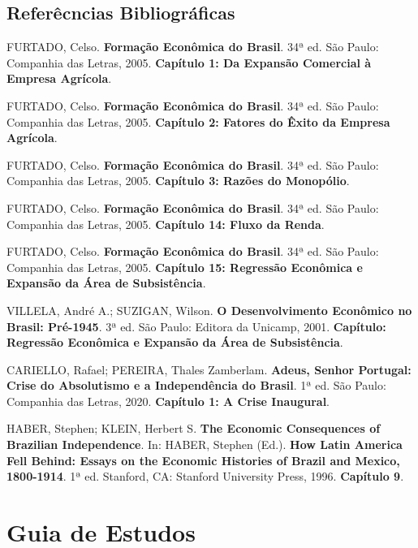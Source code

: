 \documentclass[a4paper,12pt]{article}[abntex2]
\begin{document}
\subsection{\textbf{Referêcncias Bibliográficas}}
\begin{thebibliography}{99}

FURTADO, Celso. \textbf{Formação Econômica do Brasil}. 34ª ed. São Paulo: Companhia das Letras, 2005.
\textbf{Capítulo 1: Da Expansão Comercial à Empresa Agrícola}.

FURTADO, Celso. \textbf{Formação Econômica do Brasil}. 34ª ed. São Paulo: Companhia das Letras, 2005.
\textbf{Capítulo 2: Fatores do Êxito da Empresa Agrícola}.

FURTADO, Celso. \textbf{Formação Econômica do Brasil}. 34ª ed. São Paulo: Companhia das Letras, 2005.
\textbf{Capítulo 3: Razões do Monopólio}.

FURTADO, Celso. \textbf{Formação Econômica do Brasil}. 34ª ed. São Paulo: Companhia das Letras, 2005.
\textbf{Capítulo 14: Fluxo da Renda}.

FURTADO, Celso. \textbf{Formação Econômica do Brasil}. 34ª ed. São Paulo: Companhia das Letras, 2005.
\textbf{Capítulo 15: Regressão Econômica e Expansão da Área de Subsistência}.

VILLELA, André A.; SUZIGAN, Wilson. \textbf{O Desenvolvimento Econômico no Brasil: Pré-1945}. 3ª ed. São Paulo: Editora da Unicamp, 2001.
\textbf{Capítulo: Regressão Econômica e Expansão da Área de Subsistência}.

CARIELLO, Rafael; PEREIRA, Thales Zamberlam. \textbf{Adeus, Senhor Portugal: Crise do Absolutismo e a Independência do Brasil}. 1ª ed. São Paulo: Companhia das Letras, 2020.
\textbf{Capítulo 1: A Crise Inaugural}.

HABER, Stephen; KLEIN, Herbert S. \textbf{The Economic Consequences of Brazilian Independence}. In: HABER, Stephen (Ed.). \textbf{How Latin America Fell Behind: Essays on the Economic Histories of Brazil and Mexico, 1800-1914}. 1ª ed. Stanford, CA: Stanford University Press, 1996. \textbf{Capítulo 9}.


\end{thebibliography}


\newpage
\section{\textbf{Guia de Estudos}}
\end{document}
